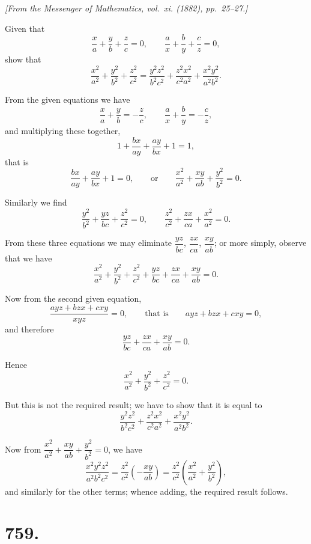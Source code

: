 \documentclass[12pt,a4paper]{article}
\begin{document}
\begin{flushright}
\textit{[From the Messenger of Mathematics, vol.~xi. (1882), pp.~25--27.]}
\end{flushright}

Given that
%
\[
\frac{x}{a} + \frac{y}{b} + \frac{z}{c} = 0,
\qquad
\frac{a}{x} + \frac{b}{y} + \frac{c}{z} = 0,
\]
show that
%
\[
\frac{x^2}{a^2} + \frac{y^2}{b^2} + \frac{z^2}{c^2}
= \frac{y^2 z^2}{b^2 c^2} + \frac{z^2 x^2}{c^2 a^2} + \frac{x^2 y^2}{a^2 b^2}.
\]

From the given equations we have
%
\[
\frac{x}{a} + \frac{y}{b} = -\frac{z}{c},
\qquad
\frac{a}{x} + \frac{b}{y} = -\frac{c}{z},
\]
%
and multiplying these together,
%
\[
1 + \frac{bx}{ay} + \frac{ay}{bx} + 1 = 1,
\]
%
that is
%
\[
\frac{bx}{ay} + \frac{ay}{bx} + 1 = 0,
\qquad \text{or} \qquad
\frac{x^2}{a^2} + \frac{xy}{ab} + \frac{y^2}{b^2} = 0.
\]

Similarly we find
%
\[
\frac{y^2}{b^2} + \frac{yz}{bc} + \frac{z^2}{c^2} = 0,
\qquad
\frac{z^2}{c^2} + \frac{zx}{ca} + \frac{x^2}{a^2} = 0.
\]

From these three equations we may eliminate $\dfrac{yz}{bc}$,
$\dfrac{zx}{ca}$, $\dfrac{xy}{ab}$; or more simply, observe that we have
%
\[
\frac{x^2}{a^2} + \frac{y^2}{b^2} + \frac{z^2}{c^2}
+ \frac{yz}{bc} + \frac{zx}{ca} + \frac{xy}{ab} = 0.
\]

Now from the second given equation,
%
\[
\frac{ayz + bzx + cxy}{xyz} = 0,
\qquad \text{that is} \qquad
ayz + bzx + cxy = 0,
\]
%
and therefore
%
\[
\frac{yz}{bc} + \frac{zx}{ca} + \frac{xy}{ab} = 0.
\]

Hence
%
\[
\frac{x^2}{a^2} + \frac{y^2}{b^2} + \frac{z^2}{c^2} = 0.
\]

But this is not the required result; we have to show that it is equal to
%
\[
\frac{y^2 z^2}{b^2 c^2} + \frac{z^2 x^2}{c^2 a^2} + \frac{x^2 y^2}{a^2 b^2}.
\]

Now from $\dfrac{x^2}{a^2} + \dfrac{xy}{ab} + \dfrac{y^2}{b^2} = 0$, we have
%
\[
\frac{x^2 y^2 z^2}{a^2 b^2 c^2}
= \frac{z^2}{c^2} \left( -\frac{xy}{ab} \right)
= \frac{z^2}{c^2} \left( \frac{x^2}{a^2} + \frac{y^2}{b^2} \right),
\]
%
and similarly for the other terms; whence adding, the required result follows.

\newpage

\section*{759.}
\end{document}
